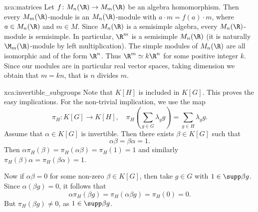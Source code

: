 \begin{sol}{xca:matrices}
	Let $f\colon M_n(\R)\to M_m(\R)$ be an 
	algebra homomorphism. Then every $M_m(\R)$-module
  is an $M_n(\R)$-module with 
	$a\cdot m=f(a)\cdot m$, where $a\in M_n(\R)$ and $m\in M$. 
	Since $M_n(\R)$ is a semisimple algebra, 
	every $M_n(\R)$-module is semisimple. In particular,
	$\R^m$ is a semisimple $M_n(\R)$ (it is naturally 
  $\M_m(\R)$-module by left multiplication). The simple 
  modules of $M_n(\R)$ are all isomorphic and 
  of the form $\R^n$. Thus $\R^m\simeq k\R^n$ for
  some positive integer $k$. Since our modules are in particular 
  real vector spaces, taking dimension we obtain that 
  $m=kn$, that is $n$ divides $m$. 
\end{sol}

\begin{sol}{xca:invertible_subgroups}
Note that $K[H]$ is included in $K[G]$. This proves the easy implications. For the non-trivial implication, we use the map 
\[ 
\pi_H\colon K[G]\to K[H],\quad \pi_H\left(\sum_{g\in G}\lambda_gg\right)=\sum_{g\in H}\lambda_gg.
\] 
Assume that $\alpha\in K[G]$ is invertible. Then there exists $\beta\in K[G]$ such that \[ 
\alpha\beta=\beta\alpha=1.
\]
Then $\alpha\pi_H(\beta)=\pi_H(\alpha\beta)=\pi_H(1)=1$ and similarly $\pi_H(\beta)\alpha=\pi_H(\beta\alpha)=1$. 

Now if $\alpha\beta=0$ for some non-zero $\beta\in K[G]$, then take $g\in G$ with $1\in\supp \beta g$. Since $\alpha(\beta g)=0$, it follows that 
\[ 
\alpha\pi_H(\beta g)=\pi_H(\alpha\beta g)=\pi_H(0)=0. 
\]
But $\pi_H(\beta g)\ne 0$, as $1\in\supp\beta g$. 
\end{sol}

